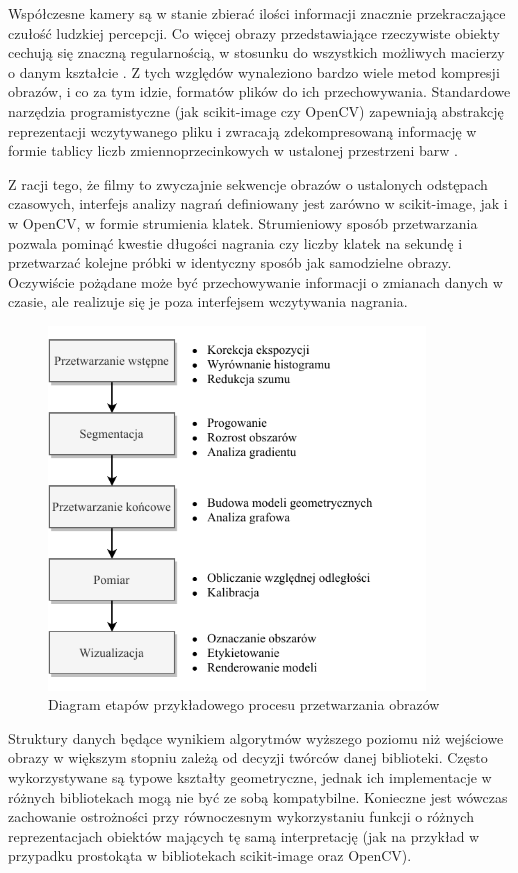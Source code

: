 Współczesne kamery są w stanie zbierać ilości informacji znacznie przekraczające czułość ludzkiej percepcji. Co więcej obrazy przedstawiające rzeczywiste obiekty cechują się znaczną regularnością, w stosunku do wszystkich możliwych macierzy o danym kształcie \cite{image_svd}. Z tych względów wynaleziono bardzo wiele metod kompresji obrazów, i co za tym idzie, formatów plików do ich przechowywania. Standardowe narzędzia programistyczne (jak scikit-image czy OpenCV) zapewniają abstrakcję reprezentacji wczytywanego pliku i zwracają zdekompresowaną informację w formie tablicy liczb zmiennoprzecinkowych w ustalonej przestrzeni barw \cite{learning_opencv}.

Z racji tego, że filmy to zwyczajnie sekwencje obrazów o ustalonych odstępach czasowych, interfejs analizy nagrań definiowany jest zarówno w scikit-image, jak i w OpenCV, w formie strumienia klatek. Strumieniowy sposób przetwarzania pozwala pominąć kwestie długości nagrania czy liczby klatek na sekundę i przetwarzać kolejne próbki w identyczny sposób jak samodzielne obrazy. Oczywiście pożądane może być przechowywanie informacji o zmianach danych w czasie, ale realizuje się je poza interfejsem wczytywania nagrania.

\begin{figure}
    \centering\includegraphics[width=100mm]{figures/Diagram przetwarzania.pdf}
    \caption{Diagram etapów przykładowego procesu przetwarzania obrazów}
    \label{fig:image_pipeline}
\end{figure}

Struktury danych będące wynikiem algorytmów wyższego poziomu niż wejściowe obrazy w większym stopniu zależą od decyzji twórców danej biblioteki. Często wykorzystywane są typowe kształty geometryczne, jednak ich implementacje w różnych bibliotekach mogą nie być ze sobą kompatybilne. Konieczne jest wówczas zachowanie ostrożności przy równoczesnym wykorzystaniu funkcji o różnych reprezentacjach obiektów mających tę samą interpretację (jak na przykład w przypadku prostokąta w bibliotekach scikit-image oraz OpenCV).

